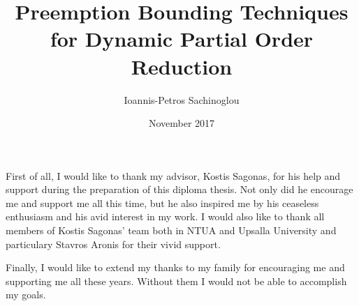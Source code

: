 \documentclass[diploma, english]{softlab-thesis}
\theoremstyle{definition}
\begin{document}

\frontmatter

\title{Preemption Bounding Techniques for Dynamic Partial Order Reduction}
\author{Ioannis-Petros Sachinoglou}
\date{November 2017}




\maketitle



\iffalse
\begin{abstractgr}%
  

  
\begin{keywordsgr}

\end{keywordsgr}
\end{abstractgr}
\fi

\begin{abstracten}%
  

  
\begin{keywordsen}

\end{keywordsen}
\end{abstracten}


\iffalse
\begin{acknowledgementsgr}
\end{acknowledgementsgr}
\fi

\begin{acknowledgementsen}

  First of all, I would like to thank my advisor, Kostis Sagonas, for his help and support during the preparation of this diploma thesis.
  Not only did he encourage me and support me all this time, but he also inspired me by his ceaseless enthusiasm and his avid interest in my
  work. I would also like to thank all members of Kostis Sagonas' team both in NTUA and Upsalla University and particulary Stavros Aronis for 
  their vivid support. 

  Finally, I would like to extend my thanks to my family for encouraging me and supporting me all these years. Without them I would not
  be able to accomplish my goals.
  
\end{acknowledgementsen}
\end{document}
